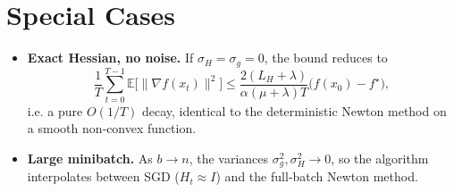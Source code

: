 \documentclass{article}
\newcommand{\EE}{\mathbb{E}}
\begin{document}
\section*{Special Cases}
\begin{itemize}
\item \textbf{Exact Hessian, no noise.}  If $\sigma_H=\sigma_g=0$, the bound reduces to
\[
\frac{1}{T}\sum_{t=0}^{T-1}\EE\!\bigl[\|\nabla f(x_t)\|^{2}\bigr]
\le \frac{2(L_H+\lambda)}{\alpha(\mu+\lambda)T}\bigl(f(x_0)-f^{\star}\bigr),
\]
i.e. a pure $O(1/T)$ decay, identical to the deterministic Newton method on a
smooth non‑convex function.
\item \textbf{Large minibatch.}  As $b\to n$, the variances $\sigma_g^{2},\sigma_H^{2}\to0$,
so the algorithm interpolates between SGD ($H_t\approx I$) and the full‑batch
Newton method.
\end{itemize}
\end{document}
